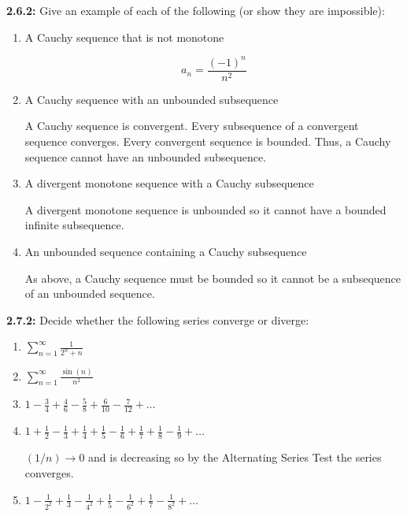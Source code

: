 \documentclass[12pt]{article}
\begin{document}
\textbf{2.6.2:} Give an example of each of the following (or show they are impossible):
\begin{enumerate}
    \item A Cauchy sequence that is not monotone

        \color{blue}
            \[a_n = \frac{(-1)^n}{n^2}\]
        \color{black}

    \item A Cauchy sequence with an unbounded subsequence 

        \color{blue}
            A Cauchy sequence is convergent. Every subsequence of a convergent sequence converges. Every convergent sequence is bounded. Thus, a Cauchy sequence cannot have an unbounded subsequence.
        \color{black}

    \item A divergent monotone sequence with a Cauchy subsequence
    
        \color{blue}
            A divergent monotone sequence is unbounded so it cannot have a bounded infinite subsequence. 
        \color{black}

    \item An unbounded sequence containing a Cauchy subsequence 
    
        \color{blue}
            As above, a Cauchy sequence must be bounded so it cannot be a subsequence of an unbounded sequence.
        \color{black}

\end{enumerate}

\textbf{2.7.2:} Decide whether the following series converge or diverge:
\begin{enumerate}
    \item $\sum_{n=1}^{\infty} \frac{1}{2^n + n}$
    
    \item $\sum_{n=1}^{\infty} \frac{\sin(n)}{n^2}$
    \item $1 - \frac{3}{4} + \frac{4}{6} - \frac{5}{8} + \frac{6}{10} - \frac{7}{12} + \dots$
    
        \color{blue}
            
        \color{black}
    
        

    \item $1 + \frac{1}{2} - \frac{1}{3} + \frac{1}{4} + \frac{1}{5} - \frac{1}{6} + \frac{1}{7} + \frac{1}{8} - \frac{1}{9} + \dots$
    
        \color{blue}
            $(1/n) \to 0$ and is decreasing so by the Alternating Series Test the series converges.
        \color{black}

    
    \item $1 - \frac{1}{2^2} + \frac{1}{3} - \frac{1}{4^2} + \frac{1}{5} - \frac{1}{6^2} + \frac{1}{7} - \frac{1}{8^2} + \dots$
    
        \color{blue}

        \color{black}

        
\end{enumerate}
\end{document}
